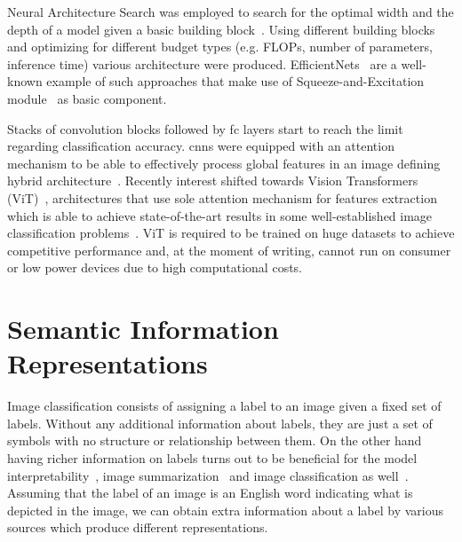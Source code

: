 Neural Architecture Search was employed to search for the optimal width and the
depth of a model given a basic building block~\cite{ProgressiveNeuLiuC2017,
GeneticCnnXieL2017, LargeScaleEvoReal2017, RegularizedEvoReal2018}. Using
different building blocks and optimizing for different budget types (e.g. FLOPs,
number of parameters, inference time) various architecture were produced.
EfficientNets~\cite{EfficientnetRTanM2019, Efficientnetv2TanM2021} are a
well-known example of such approaches that make use of Squeeze-and-Excitation
module~\cite{SqueezeAndExcHuJi2017} as basic component.

Stacks of convolution blocks followed by \acrfull{fc} layers start to reach
the limit regarding classification accuracy. \acrshort{cnn}s were equipped with
an attention mechanism to be able to effectively process global features in an
image defining hybrid architecture~\cite{SpatialTransfoJaderb2015,
LookAndThinkCaoC2015, ShowAttendAnXuKe2015, ScaCnnSpatiaChen2016}. Recently
interest shifted towards Vision Transformers
(ViT)~\cite{AnImageIsWorDosovi2020}, architectures that use sole attention
mechanism for features extraction which is able to achieve state-of-the-art
results in some well-established image classification
problems~\cite{TransformersInKhan2021, ASurveyOnVisHanK2023}. ViT is required to
be trained on huge datasets to achieve competitive performance and, at the
moment of writing, cannot run on consumer or low power devices due to high
computational costs.

\section{Semantic Information Representations}
\label{sec:semantic-information-sources}

Image classification consists of assigning a label to an image given a fixed set
of labels. Without any additional information about labels, they are just a set
of symbols with no structure or relationship between them. On the other hand
having richer information on labels turns out to be beneficial for the model
interpretability~\cite{ImprovingInterDong2017}, image
summarization~\cite{SemanticImagePasini2022} and image classification as
well~\cite{MakingBetterMBertin2019}. Assuming that the label of an image is an
English word indicating what is depicted in the image, we can obtain extra
information about a label by various sources which produce different
representations.


